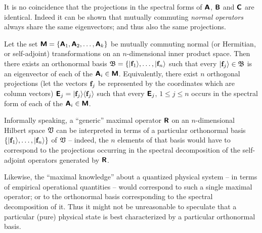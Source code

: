 It is no coincidence that the projections in the spectral forms of
$\textsf{\textbf{A}}$,
$\textsf{\textbf{B}}$  and
$\textsf{\textbf{C}}$ are identical.
Indeed it can be shown that mutually commuting {\em normal operators} always share the same eigenvectors; and thus also the same projections.

Let the set $\textsf{\textbf{M}}
=
\{
\textsf{\textbf{A}}_1,
\textsf{\textbf{A}}_2,
\ldots ,
\textsf{\textbf{A}}_k
\}
$
be mutually commuting  normal (or Hermitian, or self-adjoint) transformations on an $n$-dimensional inner product space.
Then there exists an orthonormal basis
${\frak B}= \{
\vert {\bf f}_1 \rangle ,
\ldots ,
\vert {\bf f}_n \rangle $
such that every $\vert {\bf f}_j \rangle \in {\frak B}$  is an eigenvector  of each of the $\textsf{\textbf{A}}_i \in  \textsf{\textbf{M}}$.
Equivalently, there exist $n$ orthogonal projections  (let the vectors ${\bf f}_j$ be represented by the coordinates which are column vectors)
$\textsf{\textbf{E}}_j= \vert {\bf f}_j\rangle \langle {\bf f}_j \rangle$
such that every $\textsf{\textbf{E}}_j$, $1\le j\le n$ occurs in the spectral form of each of the $\textsf{\textbf{A}}_i \in  \textsf{\textbf{M}}$.


Informally speaking,
a ``generic'' maximal operator $\textsf{\textbf{R}}$ on an $n$-dimensional Hilbert space ${\frak V}$
can be interpreted in terms of a particular orthonormal basis
$\{\vert {\bf f}_1 \rangle ,\ldots ,\vert {\bf f}_n \rangle \}$ of ${\frak V}$
-- indeed, the $n$ elements of that basis would have to correspond to the projections occurring
in the spectral decomposition of the self-adjoint operators
generated by $\textsf{\textbf{R}}$.



Likewise, the ``maximal knowledge'' about a quantized physical system -- in terms of empirical operational quantities --
would correspond to such a single maximal operator;
or to the orthonormal basis corresponding to the spectral decomposition of it.
Thus it might not be unreasonable to speculate that a particular (pure) physical state is best characterized by a particular orthonormal basis.


